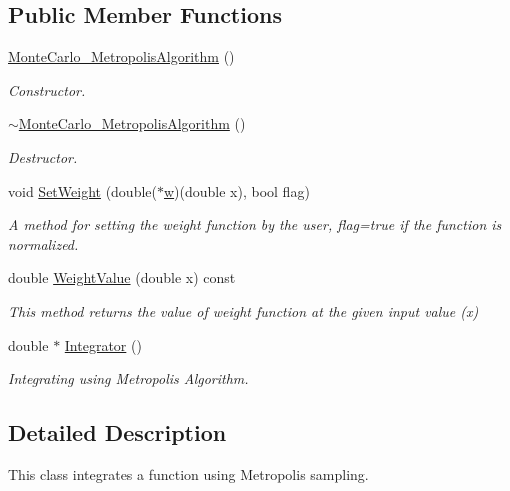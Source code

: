 \subsection*{Public Member Functions}
\begin{DoxyCompactItemize}
\item 
\hyperlink{class_monte_carlo___metropolis_algorithm_a80995ad029b056ca675c751c247426a5}{Monte\+Carlo\+\_\+\+Metropolis\+Algorithm} ()
\begin{DoxyCompactList}\small\item\em Constructor. \end{DoxyCompactList}\item 
\hyperlink{class_monte_carlo___metropolis_algorithm_aecedd40f8c0098bc66d455ef06814981}{$\sim$\+Monte\+Carlo\+\_\+\+Metropolis\+Algorithm} ()
\begin{DoxyCompactList}\small\item\em Destructor. \end{DoxyCompactList}\item 
void \hyperlink{class_monte_carlo___metropolis_algorithm_ac19d55a838561eaecea3ea519de7e091}{Set\+Weight} (double($\ast$\hyperlink{main_8cpp_a6f95c347c46d0a26fc68408b470a98df}{w})(double x), bool flag)
\begin{DoxyCompactList}\small\item\em A method for setting the weight function by the user, flag=true if the function is normalized. \end{DoxyCompactList}\item 
double \hyperlink{class_monte_carlo___metropolis_algorithm_a5295f6e5691292d833da48105b13ece4}{Weight\+Value} (double x) const
\begin{DoxyCompactList}\small\item\em This method returns the value of weight function at the given input value (x) \end{DoxyCompactList}\item 
double $\ast$ \hyperlink{class_monte_carlo___metropolis_algorithm_a93fba72a50330bf184156e23158992b2}{Integrator} ()
\begin{DoxyCompactList}\small\item\em Integrating using Metropolis Algorithm. \end{DoxyCompactList}\end{DoxyCompactItemize}


\subsection{Detailed Description}
This class integrates a function using Metropolis sampling. 

